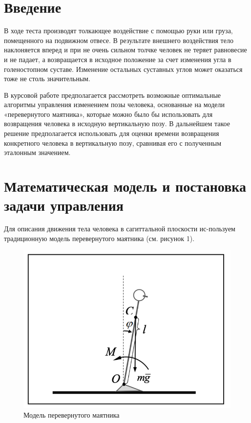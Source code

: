 \documentclass[a4paper,14pt]{article}
\theoremstyle{plain} %
\theoremstyle{definition} %
\theoremstyle{remark} %
\begin{document}
\thispagestyle{empty} %
\normalsize{
\newpage
\tableofcontents
\newpage

\section{Введение}
В ходе теста производят толкающее воздействие с помощью руки или
груза, помещенного на подвижном отвесе. В результате внешнего
воздействия тело наклоняется вперед и при не очень сильном толчке
человек не теряет равновесие и не падает, а возвращается в исходное
положение за счет изменения угла в голеностопном суставе. Изменение
остальных суставных углов может оказаться тоже не столь значительным.

В курсовой работе предполагается рассмотреть возможные оптимальные
алгоритмы управления изменением позы человека, основанные на модели
«перевернутого маятника», которые можно было бы использовать для
возвращения человека в исходную вертикальную позу. В дальнейшем
такое решение предполагается использовать для оценки времени
возвращения конкретного человека в вертикальную позу, сравнивая
его с полученным эталонным значением.
\newpage
\section{Математическая модель и постановка задачи управления}
Для описания движения тела человека в сагиттальной плоскости ис-пользуем традиционную модель перевернутого маятника (см. рисунок 1).

\begin{figure}[h!]
    \centering
    \includegraphics[width=1.00\linewidth]{pendulum.png}
    \caption{Модель перевернутого маятника}
    \label{fig:pendulum}
\end{figure}

}
\end{document}
